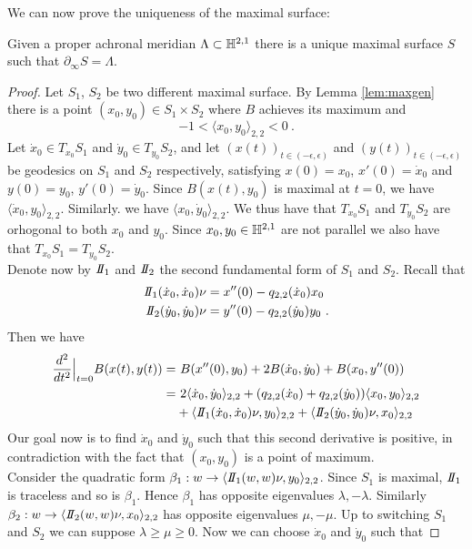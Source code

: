 We can now prove the uniqueness of the maximal surface:
\begin{theorem} \label{lem:max}
    Given a proper achronal meridian $\Lambda \subset \mathbb{H}^{2,1}$ there is a unique maximal surface $S$ such that $\partial_\infty S = \Lambda$.
\end{theorem}
\begin{proof}
    Let $S_1$, $S_2$ be two different maximal surface. By Lemma \ref{lem:maxgen} there is a point $(x_0,y_0)\in S_1 \times S_2$ where $B$ achieves its maximum and 
    \[
        -1 < \langle x_0,y_0 \rangle_{2,2} < 0 \ .
    \]
    Let $\dot{x}_0 \in T_{x_0}S_1$ and $\dot{y}_0 \in T_{y_0}S_2$, and let $(x(t))_{t\in(-\epsilon, \epsilon)}$ and $(y(t))_{t\in(-\epsilon, \epsilon)}$ be geodesics on $S_1$ and $S_2$ respectively, satisfying $x(0) = x_0$, $x'(0) = \dot{x}_0$ and $y(0) = y_0$, $y'(0) = \dot{y}_0$.
    Since $B(x(t), y_0)$ is maximal at $t=0$, we have $\langle \dot{x}_0,y_0 \rangle_{2,2}$. Similarly. we have $\langle x_0, \dot{y}_0 \rangle_{2,2}$. We thus have that $T_{x_0}S_1$ and $T_{y_0}S_2$ are orhogonal to both $x_0$ and $y_0$. Since $x_0, y_0 \in \mathbb{H}^{2,1}$ are not  parallel we also have that $T_{x_0}S_1 = T_{y_0}S_2$.\\
    Denote now by $\II_1$ and $\II_2$ the second fundamental form of $S_1$ and $S_2$. Recall that
    \[
    \begin{split}
        \II_1(\dot{x}_0,\dot{x}_0)\nu  & = x''(0) - q_{2,2}(\dot{x}_0) x_0 \\
        \II_2(\dot{y}_0,\dot{y}_0)\nu  & = y''(0) - q_{2,2}(\dot{y}_0) y_0 \ .
    \end{split}    
    \]
    Then we have
    \[ 
    \begin{split}
        \frac{d^2}{dt^2}\Big|_{t=0} B(x(t),y(t))  = & \ B(x''(0), y_0) + 2B(\dot{x}_0, \dot{y}_0) + B(x_0, y''(0)) \\
         = & \ 2\langle \dot{x}_0, \dot{y}_0 \rangle_{2,2} + (q_{2,2}(\dot{x}_0) + q_{2,2}(\dot{y}_0)) \langle x_0, y_0 \rangle_{2,2} \\
         & + \langle  \II_1(\dot{x}_0,\dot{x}_0)\nu , y_0 \rangle_{2,2} + \langle \II_2(\dot{y}_0,\dot{y}_0)\nu , x_0 \rangle_{2,2}
    \end{split}
    \]
    Our goal now is to find $\dot{x}_0$ and $\dot{y}_0$ such that this second derivative is positive, in contradiction with the fact that $(x_0, y_0)$ is a point of maximum.\\
    Consider the quadratic form $\beta_1 : w \to \langle  \II_1(w,w)\nu , y_0 \rangle_{2,2}$. Since $S_1$ is maximal, $\II_1$ is traceless and so is $\beta_1$. Hence $\beta_1$ has opposite eigenvalues $\lambda, -\lambda$. Similarly $\beta_2 : w \to \langle \II_2(w,w)\nu , x_0 \rangle_{2,2}$ has opposite eigenvalues $\mu,-\mu$. Up to switching $S_1$ and $S_2$ we can suppose $\lambda \geq \mu \geq 0$. Now we can choose $\dot{x}_0$ and $\dot{y}_0$ such that

\end{proof}
